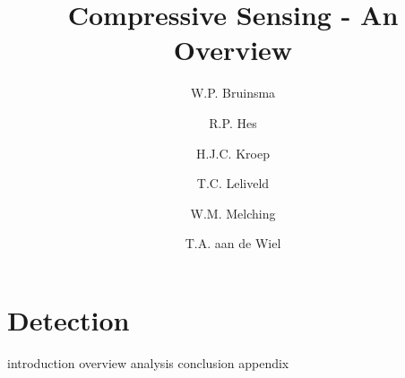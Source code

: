 \documentclass[a4paper, openany, oneside]{memoir}
\title{Compressive Sensing - An Overview}
\author{W.P. Bruinsma \and R.P. Hes \and H.J.C. Kroep \and T.C. Leliveld \and W.M. Melching \and T.A. aan de Wiel}
\begin{document}
\chapter{Detection}
\label{cha:detection}
{introduction}
{overview}
{analysis}
{conclusion}
{appendix}
\end{document}
